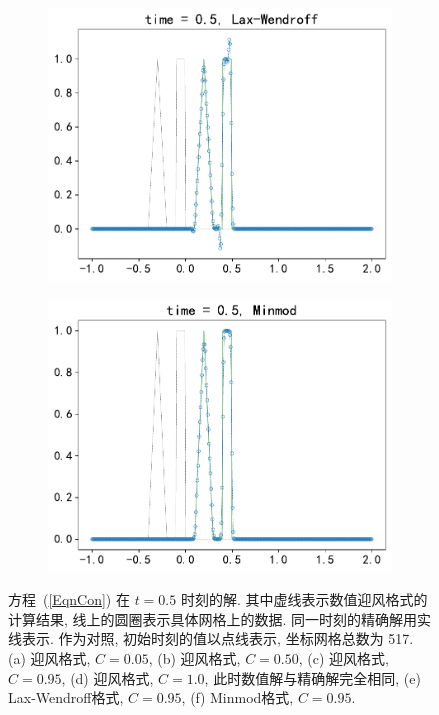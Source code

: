 \documentclass[10.5pt
]{article}
\begin{document}
\begin{figure}
\begin{subfigure}{.48\linewidth}
  \includegraphics[width=\textwidth]{figures/problem1_lax_wendroff0.95.pdf}
  \caption{}
  \label{fig:problem1-5}
\end{subfigure}
\hfill
\begin{subfigure}{.48\linewidth}
  \includegraphics[width=\textwidth]{figures/problem1_limiter0.95.pdf}
  \caption{}
  \label{fig:problem1-6}
\end{subfigure}
\caption{方程~(\ref{EqnCon}) 在 $t=0.5$ 时刻的解. 其中虚线表示数值迎风格式的计算结果, 线上的圆圈表示具体网格上的数据. 同一时刻的精确解用实线表示. 作为对照,
  初始时刻的值以点线表示, 坐标网格总数为 517. (a) 迎风格式, $C = 0.05$, (b)  迎风格式, $C = 0.50$, (c)  迎风格式, $C = 0.95$, (d) 迎风格式, $C = 1.0$,
  此时数值解与精确解完全相同, (e) Lax-Wendroff格式, $C=0.95$,  (f) Minmod格式, $C=0.95$.} \label{LinearW}
  \label{fig:problem1}%
\end{figure}
\end{document}
